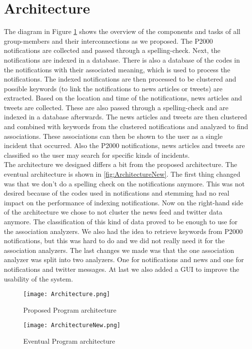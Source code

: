 \newpage
\section{Architecture}
The diagram in Figure \ref{fig:Architecture} shows the overview of the components and tasks of all group-members and their interconnections as we proposed. The P2000 notifications are collected and passed through a spelling-check. Next, the notifications are indexed in a database. There is also a database of the codes in the notifications with their associated meaning, which is used to process the notifications. The indexed notifications are then processed to be clustered and possible keywords (to link the notifications to news articles or tweets) are extracted. Based on the location and time of the notifications, news articles and tweets are collected. These are also passed through a spelling-check and are indexed in a database afterwards. The news articles and tweets are then clustered and combined with keywords from the clustered notifications and analyzed to find associations. These associations can then be shown to the user as a single incident that occurred. Also the P2000 notifications, news articles and tweets are classified so the user may search for specific kinds of incidents. \\

The architecture we designed differs a bit from the proposed architecture. The eventual architecture is shown in \autoref{fig:ArchitectureNew}. The first thing changed was that we don't do a spelling check on the notifications anymore. This was not desired because of the codes used in notifications and stemming had no real impact on the performance of indexing notifications. Now on the right-hand side of the architecture we chose to not cluster the news feed and twitter data anymore. The classification of this kind of data proved to be enough to use for the association analyzers. We also had the idea to retrieve keywords from P2000 notifications, but this was hard to do and we did not really need it for the association analyzers. The last changes we made was that the one association analyzer was split into two analyzers. One for notifications and news and one for notifications and twitter messages. At last we also added a GUI to improve the usability of the system.

\begin{center}
\begin{figure}[h!]
  \texttt{[image: Architecture.png]}
  \caption{Proposed Program architecture}
  \label{fig:Architecture}
\end{figure}

\begin{figure}[h!]
  \texttt{[image: ArchitectureNew.png]}
  \caption{Eventual Program architecture}
  \label{fig:ArchitectureNew}
\end{figure}
\end{center}